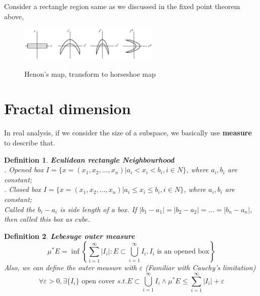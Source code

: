 \documentclass[12pt]{article}
\theoremstyle{plain}
\newtheorem{definition}{{\color{red}\textbf{Definition}}}[section]
\begin{document}
Consider a rectangle region same as we discussed in the fixed point theorem above, 

\begin{figure}[H]
\begin{center}
\includegraphics[width=0.6\textwidth]{figure/section5/henon-horseshoe.png} \\
\end{center}
\caption{Henon's map, transform to horseshoe map}
\end{figure}








\newpage
\section{Fractal dimension}

In real analysis, if we consider the size of a subspace, we basically use \textbf{measure} to describe that.

\begin{definition}\textbf{Eculidean rectangle Neighbourhood}
\\. Opened box $I = \{x = (x_1, x_2, \ldots ,x_n) | a_i < x_i < b_i, i \in N\}$, where $a_i, b_i$ are constant;
\\. Closed box $I = \{x = (x_1, x_2, \ldots ,x_n) | a_i \leq x_i \leq b_i, i \in N\}$, where $a_i, b_i$ are constant;
\\\noindent Called the $b_i - a_i$ is side length of a box. If $|b_1 - a_1| = |b_2 - a_2| = \ldots = |b_n - a_n|$, then called this box as cube.
\end{definition}



\begin{definition}\textbf{Lebesuge outer measure}
$$
\mu^*E = \inf \left\{ \sum_{i = 1}^{\infty}|I_i|: E \subset \bigcup_{i = 1}^{\infty} I_i, I_i\text{ is an opened box}\right\}
$$
  \noindent Also, we can define the outer measure with $\varepsilon$ (Familiar with Cauchy's limitation)
$$
\forall \varepsilon >0, \exists \{I_i\}\text{ open cover } s.t. E\subset\bigcup_{i = 1}^{\infty} I_i \land \mu^*E\leq \sum_{i = 1}^{\infty}|I_i| + \varepsilon
$$
\end{definition}
\end{document}
